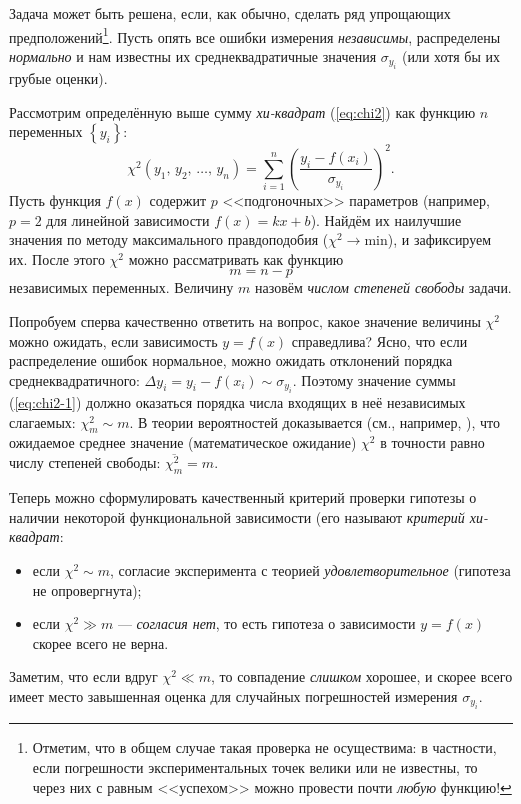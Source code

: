 Задача может быть решена, если, как обычно, сделать ряд упрощающих
предположений\footnote{Отметим, что в общем случае такая проверка не осуществима:
в частности, если погрешности экспериментальных точек велики или не
известны, то через них с равным <<успехом>>
можно провести почти \emph{любую} функцию!}. 
Пусть опять все ошибки измерения \emph{независимы},
распределены \emph{нормально} и нам известны их
среднеквадратичные значения $\sigma_{y_{i}}$ 
(или хотя бы их грубые оценки).

Рассмотрим определённую выше сумму \emph{хи-квадрат} (\ref{eq:chi2}) 
как функцию $n$ переменных $\left\{ y_{i}\right\}$:
\begin{equation}
\chi^{2}\!\left(y_{1},\,y_{2},\,\ldots,\,y_{n}\right)=\sum\limits _{i=1}^{n}\left(\frac{y_{i}-f\!\left(x_{i}\right)}{\sigma_{y_{i}}}\right)^{2}.\label{eq:chi2-1}
\end{equation}
Пусть функция $f\!\left(x\right)$ содержит $p$ <<подгоночных>>
параметров (например, $p=2$ для линейной зависимости $f\!\left(x\right)=kx+b$).
Найдём их наилучшие значения по методу максимального правдоподобия
($\chi^{2}\to\mathrm{min}$), и зафиксируем их. После этого $\chi^{2}$
можно рассматривать как функцию 
\[
m=n-p
\]
независимых переменных. Величину $m$ назовём \emph{числом степеней свободы} задачи.

Попробуем сперва качественно ответить на вопрос, какое значение
величины $\chi^{2}$ можно ожидать, если зависимость $y=f\!\left(x\right)$
справедлива? Ясно, что если распределение ошибок нормальное, можно
ожидать отклонений порядка среднеквадратичного: $\Delta y_{i}=y_{i}-f\!\left(x_{i}\right)\sim\sigma_{y_{i}}$.
Поэтому значение суммы (\ref{eq:chi2-1}) должно оказаться порядка
числа входящих в неё независимых слагаемых: $\chi_{m}^{2}\sim m$.
В теории вероятностей доказывается (см., например, \cite{hudson}), что ожидаемое среднее значение (математическое ожидание) $\chi^{2}$ в точности равно числу степеней свободы: $\overline{\chi_{m}^{2}}=m$.

Теперь можно сформулировать качественный критерий проверки
гипотезы о наличии некоторой функциональной зависимости (его называют
\emph{критерий хи-квадрат}:
\begin{itemize}
\item  если $\chi^{2}\sim m$, согласие эксперимента с теорией \emph{удовлетворительное}
(гипотеза не опровергнута); 
\item если $\chi^{2}\gg m$ --- \emph{согласия нет}, 
то есть гипотеза о зависимости $y=f\!\left(x\right)$ скорее всего не верна.
\end{itemize}
Заметим, что если вдруг $\chi^{2}\ll m$, то совпадение \emph{слишком}
хорошее, и скорее всего имеет место завышенная оценка для случайных
погрешностей измерения $\sigma_{y_{i}}$.

